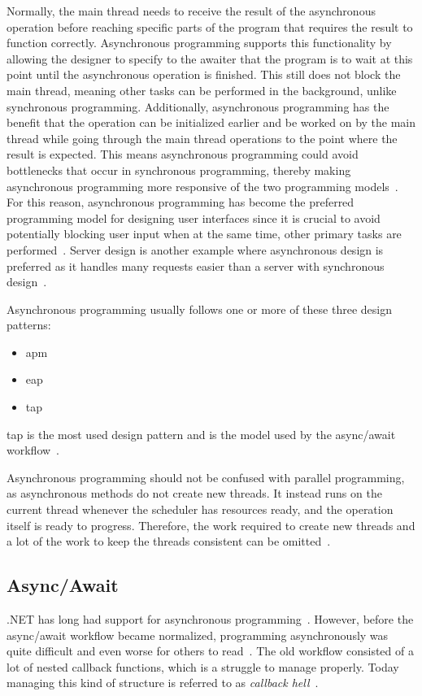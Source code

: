 Normally, the main thread needs to receive the result of the asynchronous operation before reaching specific parts of the program that requires the result to function correctly. Asynchronous programming supports this functionality by allowing the designer to specify to the awaiter that the program is to wait at this point until the asynchronous operation is finished. This still does not block the main thread, meaning other tasks can be performed in the background, unlike synchronous programming. Additionally, asynchronous programming has the benefit that the operation can be initialized earlier and be worked on by the main thread while going through the main thread operations to the point where the result is expected. This means asynchronous programming could avoid bottlenecks that occur in synchronous programming, thereby making asynchronous programming more responsive of the two programming models~\cite{DOC:TaskAsyncProgModel, WEB:AsyncAwaitTut}.
For this reason, asynchronous programming has become the preferred programming model for designing user interfaces since it is crucial to avoid potentially blocking user input when at the same time, other primary tasks are performed~\cites{VIDEO:AsyncConBack}[p.~214]{BOOK:DotnetMultithreadCookBook}. Server design is another example where asynchronous design is preferred as it handles many requests easier than a server with synchronous design~\cite{VIDEO:AsyncConBack, DOC:AsyncAwait}.

Asynchronous programming usually follows one or more of these three design patterns:
\begin{itemize}
	\item{\ac{apm}}
	\item{\ac{eap}}	
	\item{\ac{tap}}
\end{itemize}
\ac{tap} is the most used design pattern and is the model used by the async/await workflow~\cite{DOC:AsyncAwait, WEB:AsyncAwaitTut}.

Asynchronous programming should not be confused with parallel programming, as asynchronous methods do not create new threads. It instead runs on the current thread whenever the scheduler has resources ready, and the operation itself is ready to progress. Therefore, the work required to create new threads and a lot of the work to keep the threads consistent can be omitted~\cite{DOC:TaskAsyncProgModel}. 

\subsection{Async/Await}
.NET has long had support for asynchronous programming~\cite{WEB:asyncNelsen}. However, before the async/await workflow became normalized, programming asynchronously was quite difficult and even worse for others to read~\cites{DOC:TaskAsyncProgModel, WEB:asyncNelsen}. The old workflow consisted of a lot of nested callback functions, which is a struggle to manage properly. Today managing this kind of structure is referred to as \emph{callback hell}~\cites[p.~1-2]{PAPER:Callbackhell}[p~.2]{PAPER:PaxosCleipnir}.

